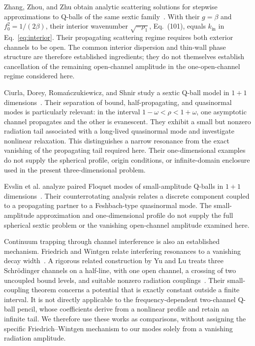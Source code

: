 Zhang, Zhou, and Zhu obtain analytic scattering solutions for stepwise
approximations to Q-balls of the same sextic
family~\cite{ZhangZhouZhu2025}. With their $g=\beta$ and
$f_0^2=1/(2\beta)$, their interior wavenumber $\sqrt{-\rho_1}$,
Eq.~(101), equals $k_{\mathrm{in}}$ in Eq.~\eqref{eq:interior}.
Their propagating scattering regime requires both exterior channels to
be open. The common interior dispersion and thin-wall phase structure
are therefore established ingredients; they do not themselves establish
cancellation of the remaining open-channel amplitude in the
one-open-channel regime considered here.

Ciurla, Dorey, Roma\'nczukiewicz, and Shnir study a sextic Q-ball model in
$1+1$ dimensions~\cite{Ciurla2024}. Their separation of bound,
half-propagating, and quasinormal modes is particularly relevant: in the
interval $1-\omega<\rho<1+\omega$, one asymptotic channel propagates and
the other is evanescent. They exhibit a small but nonzero radiation tail
associated with a long-lived quasinormal mode and investigate nonlinear
relaxation. This distinguishes a narrow resonance from the exact
vanishing of the propagating tail required here. Their one-dimensional
examples do not supply the spherical profile, origin conditions, or
infinite-domain enclosure used in the present three-dimensional problem.

Evslin et al. analyze paired Floquet modes of small-amplitude Q-balls in
$1+1$ dimensions~\cite{Evslin2026}. Their counterrotating analysis relates
a discrete component coupled to a propagating partner to a Feshbach-type
quasinormal mode. The small-amplitude approximation and one-dimensional
profile do not supply the full spherical sextic problem or the vanishing
open-channel amplitude examined here.

Continuum trapping through channel interference is also an established
mechanism. Friedrich and Wintgen relate interfering resonances to a
vanishing decay width~\cite{FriedrichWintgen1985}. A rigorous related
construction by Yu and Lu treats three Schr\"odinger channels on a
half-line, with one open channel, a crossing of two uncoupled bound
levels, and suitable nonzero radiation couplings~\cite{YuLu2025}.
Their small-coupling theorem concerns a potential that is exactly constant
outside a finite interval. It is not directly applicable to the
frequency-dependent two-channel Q-ball pencil, whose coefficients derive
from a nonlinear profile and retain an infinite tail. We therefore use
these works as comparisons, without assigning the specific
Friedrich--Wintgen mechanism to our modes solely from a vanishing
radiation amplitude.

